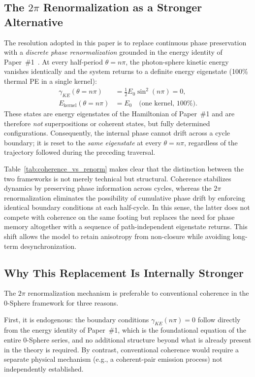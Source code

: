 \documentclass[%
 reprint, amsmath,amssymb, aps, prd, ]{revtex4-2}
\numberwithin{equation}{section}
\newcommand{\iphase}{\theta}
\begin{document}
\subsection{The $2\pi$ Renormalization as a Stronger Alternative}

The resolution adopted in this paper is to replace continuous phase preservation with a \emph{discrete phase renormalization} grounded in the energy identity of Paper~\#1~\cite{hanamura01}.
At every half-period $\iphase = n\pi$, the photon-sphere kinetic energy vanishes identically and the system returns to a definite energy eigenstate (100\% thermal PE in a single kernel):
\begin{align}
\gamma_{KE}(\iphase = n\pi) &= \tfrac{1}{2}E_0\sin^2(n\pi) = 0,
\label{eq:KE_zero}\\
E_\mathrm{kernel}(\iphase = n\pi) &= E_0 \quad \text{(one kernel, 100\%).}
\label{eq:PE_full}
\end{align}
These states are energy eigenstates of the Hamiltonian of Paper~\#1 and are therefore \emph{not} superpositions or coherent states, but fully determined configurations.
Consequently, the internal phase cannot drift across a cycle boundary; it is reset to the \emph{same eigenstate} at every $\iphase = n\pi$, regardless of the trajectory followed during the preceding traversal.

Table~\ref{tab:coherence_vs_renorm} makes clear that the distinction between the two frameworks is not merely technical but structural. Coherence stabilizes dynamics by preserving phase information across cycles, whereas the $2\pi$ renormalization eliminates the possibility of cumulative phase drift by enforcing identical boundary conditions at each half-cycle.
In this sense, the latter does not compete with coherence on the same footing but replaces the need for phase memory altogether with a sequence of path-independent eigenstate returns. This shift allows the model to retain anisotropy from non-closure while avoiding long-term desynchronization.

\subsection{Why This Replacement Is Internally Stronger}

The $2\pi$ renormalization mechanism is preferable to conventional coherence in the 0-Sphere framework for three reasons.

First, it is endogenous: the boundary conditions $\gamma_{KE}(n\pi) = 0$ follow directly from the energy identity of Paper~\#1, which is the foundational equation of the entire 0-Sphere series, and no additional structure beyond what is already present in the theory is required. By contrast, conventional coherence would require a separate physical mechanism (e.g., a coherent-pair emission process) not independently established.
\end{document}
